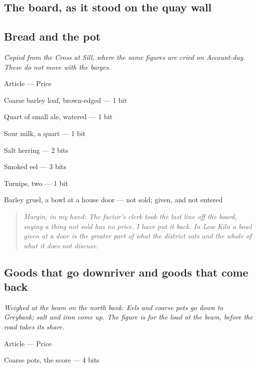 \documentclass{design/chronicle}
\begin{document}
\subsection*{The board, as it stood on the quay wall}

\subsection*{Bread and the pot}

\emph{Copied from the Cross at Sill, where the same figures are cried on Account-day. These do not move with the barges.}

Article — Price\par

Coarse barley loaf, brown-edged — 1 bit\par

Quart of small ale, watered — 1 bit\par

Sour milk, a quart — 1 bit\par

Salt herring — 2 bits\par

Smoked eel — 3 bits\par

Turnips, two — 1 bit\par

Barley gruel, a bowl at a house door — not sold; given, and not entered\par

\begin{quote}\itshape \emph{Margin, in my hand:} The factor’s clerk took the last line off the board, saying a thing not sold has no price. I have put it back. In Low Kiln a bowl given at a door is the greater part of what the district eats and the whole of what it does not discuss.\end{quote}

\subsection*{Goods that go downriver and goods that come back}

\emph{Weighed at the beam on the north bank. Eels and coarse pots go down to Greybank; salt and iron come up. The figure is for the load at the beam, before the road takes its share.}

Article — Price\par

Coarse pots, the score — 4 bits\par
\end{document}
